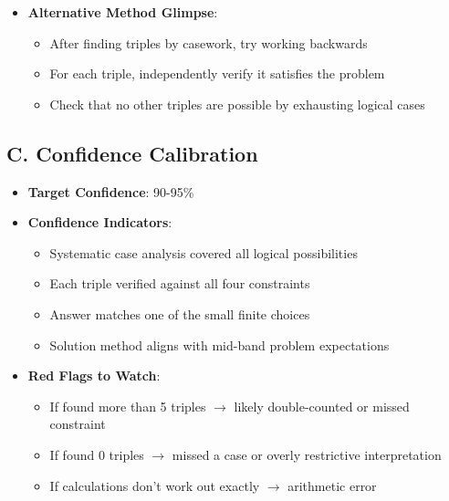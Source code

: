 \documentclass[11pt]{article}
\begin{document}
\begin{verificationbox}
\begin{itemize}[leftmargin=*]
    \item \textbf{Alternative Method Glimpse}: 
    \begin{itemize}
        \item After finding triples by casework, try working backwards
        \item For each triple, independently verify it satisfies the problem
        \item Check that no other triples are possible by exhausting logical cases
    \end{itemize}
\end{itemize}

\subsection*{C. Confidence Calibration}
\begin{itemize}[leftmargin=*]
    \item \textbf{Target Confidence}: 90-95\%
    \item \textbf{Confidence Indicators}:
    \begin{itemize}
        \item[$\checkmark$] Systematic case analysis covered all logical possibilities
        \item[$\checkmark$] Each triple verified against all four constraints
        \item[$\checkmark$] Answer matches one of the small finite choices
        \item[$\checkmark$] Solution method aligns with mid-band problem expectations
    \end{itemize}
    \item \textbf{Red Flags to Watch}:
    \begin{itemize}
        \item If found more than 5 triples $\rightarrow$ likely double-counted or missed constraint
        \item If found 0 triples $\rightarrow$ missed a case or overly restrictive interpretation
        \item If calculations don't work out exactly $\rightarrow$ arithmetic error
    \end{itemize}
\end{itemize}
\end{verificationbox}
\end{document}
